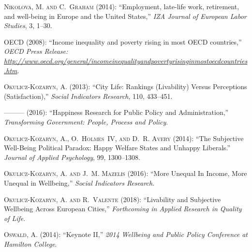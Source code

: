 \textsc{Nikolova, M. and C.~Graham} (2014): \enquote{Employment, late-life
  work, retirement, and well-being in Europe and the United States,} \emph{IZA
  Journal of European Labor Studies}, 3, 1--30.

\textsc{OECD} (2008): \enquote{Income inequality and poverty rising in most
  OECD countries,} \emph{OECD Press Release:
  \url{http://www.oecd.org/general/incomeinequalityandpovertyrisinginmostoecdcountries.htm}}.

\textsc{Okulicz-Kozaryn, A.} (2013): \enquote{City Life: Rankings (Livability)
  Versus Perceptions (Satisfaction),} \emph{Social Indicators Research}, 110,
  433--451.

---\hspace{-.1pt}---\hspace{-.1pt}--- (2016): \enquote{Happiness Research for
  Public Policy and Administration,} \emph{Transforming Government: People,
  Process and Policy}.

\textsc{Okulicz-Kozaryn, A., O.~Holmes~IV, and D.~R. Avery} (2014):
  \enquote{The Subjective Well-Being Political Paradox: Happy Welfare States
  and Unhappy Liberals.} \emph{Journal of Applied Psychology}, 99, 1300--1308.

\textsc{Okulicz-Kozaryn, A. and J.~M. Mazelis} (2016): \enquote{More Unequal In
  Income, More Unequal in Wellbeing,} \emph{Social Indicators Research}.

\textsc{Okulicz-Kozaryn, A. and R.~Valente} (2018): \enquote{Livability and
  Subjective Wellbeing Across European Cities,} \emph{Forthcoming in Applied
  Research in Quality of Life}.

\textsc{Oswald, A.} (2014): \enquote{Keynote II,} \emph{2014 Wellbeing and
  Public Policy Conference at Hamilton College}.

